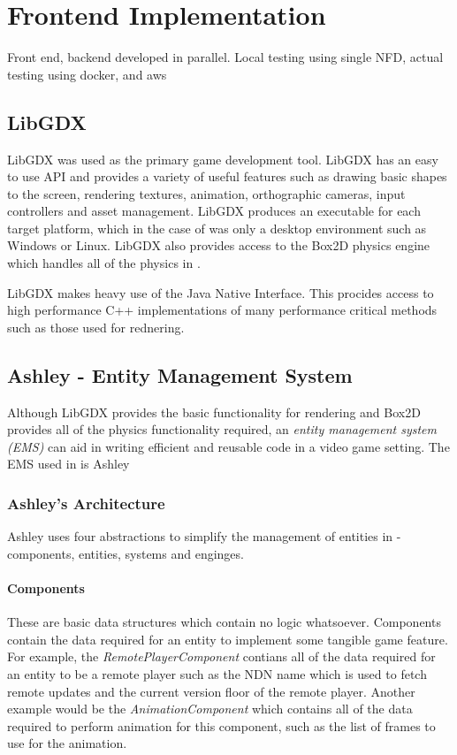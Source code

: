 \chapter{Frontend Implementation}
Front end, backend developed in parallel. Local testing using single NFD, actual testing using docker, and aws

\section{LibGDX}
LibGDX \cite{libgdx} was used as the primary game development tool. LibGDX has an easy to use API and provides a variety of useful features such as drawing basic shapes to the screen, rendering textures, animation, orthographic cameras, input controllers and asset management. LibGDX produces an executable for each target platform, which in the case of \game{} was only a desktop environment such as Windows or Linux. LibGDX also provides access to the Box2D \cite{box2d} physics engine which handles all of the physics in \game{}. 

LibGDX makes heavy use of the Java Native Interface. This procides access to high performance C++ implementations of many performance critical methods such as those used for rednering. 


\section{Ashley - Entity Management System}\label{sec:impl:ashley}
Although LibGDX provides the basic functionality for rendering and Box2D provides all of the physics functionality required, an \textit{entity management system (EMS)} can aid in writing efficient and reusable code in a video game setting. The EMS used in \game{} is Ashley \cite{ashley}

\subsection{Ashley's Architecture}
Ashley uses four abstractions to simplify the management of entities in \game{} - components, entities, systems and enginges. 

\subsubsection{Components}
These are basic data structures which contain no logic whatsoever. Components contain the data required for an entity to implement some tangible game feature. For example, the \textit{RemotePlayerComponent} contians all of the data required for an entity to be a remote player such as the NDN name which is used to fetch remote updates and the current version floor of the remote player. Another example would be the \textit{AnimationComponent} which contains all of the data required to perform animation for this component, such as the list of frames to use for the animation. 

